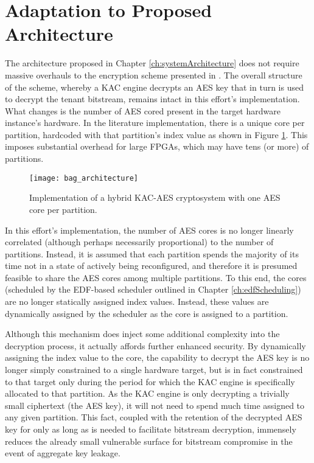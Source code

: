 \section{Adaptation to Proposed Architecture}\label{sec:KACArchitecture}
The architecture proposed in Chapter \ref{ch:systemArchitecture} does not require massive overhauls to the encryption scheme presented in \cite{bag_cryptographically_2020}. The overall structure of the scheme, whereby a KAC engine decrypts an AES key that in turn is used to decrypt the tenant bitstream, remains intact in this effort's implementation. What changes is the number of AES cored present in the target hardware instance's hardware. In the literature implementation, there is a unique core per partition, hardcoded with that partition's index value as shown in Figure \ref{fig:bag_architecture}. This imposes substantial overhead for large FPGAs, which may have tens (or more) of partitions. 

\begin{figure}[h]
    \centering
    \texttt{[image: bag\_architecture]}
    \caption[Literature Cryptosystem Implementation]{Implementation of a hybrid KAC-AES cryptosystem with one AES core per partition. \cite{bag_cryptographically_2020}}
    \label{fig:bag_architecture}
\end{figure}


In this effort's implementation, the number of AES cores is no longer linearly correlated (although perhaps necessarily proportional) to the number of partitions. Instead, it is assumed that each partition spends the majority of its time not in a state of actively being reconfigured, and therefore it is presumed feasible to share the AES cores among multiple partitions. To this end, the cores (scheduled by the EDF-based scheduler outlined in Chapter \ref{ch:edfScheduling}) are no longer statically assigned index values. Instead, these values are dynamically assigned by the scheduler as the core is assigned to a partition.

Although this mechanism does inject some additional complexity into the decryption process, it actually affords further enhanced security. By dynamically assigning the index value to the core, the capability to decrypt the AES key is no longer simply constrained to a single hardware target, but is in fact constrained to that target only during the period for which the KAC engine is specifically allocated to that partition. As the KAC engine is only decrypting a trivially small ciphertext (the AES key), it will not need to spend much time assigned to any given partition. This fact, coupled with the retention of the decrypted AES key for only as long as is needed to facilitate bitstream decryption, immensely reduces the already small vulnerable surface for bitstream compromise in the event of aggregate key leakage.